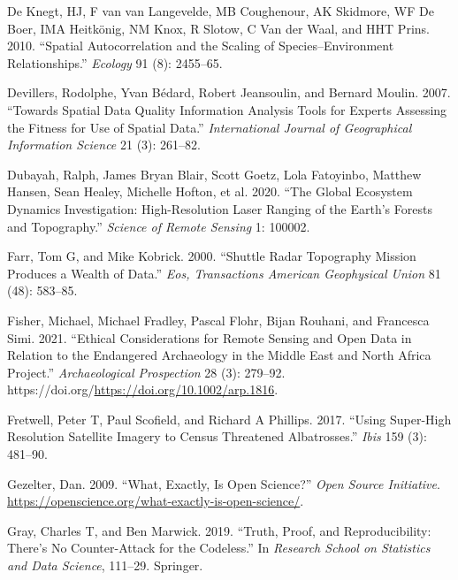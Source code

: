 \documentclass[
  12pt,
]{article}
\newlength{\cslhangindent}
\newlength{\cslentryspacingunit} %
\newenvironment{CSLReferences}[2] %
 {%
  \setlength{\parindent}{0pt}
  \ifodd #1
  \let\oldpar\par
  \def\par{\hangindent=\cslhangindent\oldpar}
  \fi
  \setlength{\parskip}{#2\cslentryspacingunit}
 }%
 {}
\begin{document}
\begin{CSLReferences}{1}{0}
\leavevmode{}%
De Knegt, HJ, F van van Langevelde, MB Coughenour, AK Skidmore, WF De
Boer, IMA Heitkönig, NM Knox, R Slotow, C Van der Waal, and HHT Prins.
2010. {``Spatial Autocorrelation and the Scaling of Species--Environment
Relationships.''} \emph{Ecology} 91 (8): 2455--65.

\leavevmode{}%
Devillers, Rodolphe, Yvan Bédard, Robert Jeansoulin, and Bernard Moulin.
2007. {``Towards Spatial Data Quality Information Analysis Tools for
Experts Assessing the Fitness for Use of Spatial Data.''}
\emph{International Journal of Geographical Information Science} 21 (3):
261--82.

\leavevmode{}%
Dubayah, Ralph, James Bryan Blair, Scott Goetz, Lola Fatoyinbo, Matthew
Hansen, Sean Healey, Michelle Hofton, et al. 2020. {``The Global
Ecosystem Dynamics Investigation: High-Resolution Laser Ranging of the
Earth's Forests and Topography.''} \emph{Science of Remote Sensing} 1:
100002.

\leavevmode{}%
Farr, Tom G, and Mike Kobrick. 2000. {``Shuttle Radar Topography Mission
Produces a Wealth of Data.''} \emph{Eos, Transactions American
Geophysical Union} 81 (48): 583--85.

\leavevmode{}%
Fisher, Michael, Michael Fradley, Pascal Flohr, Bijan Rouhani, and
Francesca Simi. 2021. {``Ethical Considerations for Remote Sensing and
Open Data in Relation to the Endangered Archaeology in the Middle East
and North Africa Project.''} \emph{Archaeological Prospection} 28 (3):
279--92. https://doi.org/\url{https://doi.org/10.1002/arp.1816}.

\leavevmode{}%
Fretwell, Peter T, Paul Scofield, and Richard A Phillips. 2017. {``Using
Super-High Resolution Satellite Imagery to Census Threatened
Albatrosses.''} \emph{Ibis} 159 (3): 481--90.

\leavevmode{}%
Gezelter, Dan. 2009. {``What, Exactly, Is {Open} {Science}?''}
\emph{Open Source Initiative}.
\url{https://openscience.org/what-exactly-is-open-science/}.

\leavevmode{}%
Gray, Charles T, and Ben Marwick. 2019. {``Truth, Proof, and
Reproducibility: There's No Counter-Attack for the Codeless.''} In
\emph{Research School on Statistics and Data Science}, 111--29.
Springer.


\end{CSLReferences}
\end{document}
